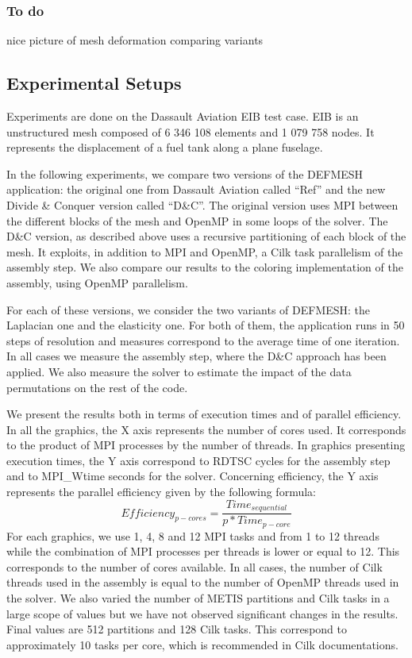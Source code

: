 \documentclass{IOS-Book-Article}
\begin{document}
\subsubsection{To do}
nice picture of mesh deformation comparing variants\\

\subsection{Experimental Setups}
Experiments are done on the Dassault Aviation EIB test case. EIB is an unstructured mesh composed of 6 346 108 elements and 1 079 758 nodes.
It represents the displacement of a fuel tank along a plane fuselage.

In the following experiments, we compare two versions of the DEFMESH application: the original one from Dassault Aviation called “Ref” and the new Divide \& Conquer
version called “D\&C”.
The original version uses MPI between the different blocks of the mesh and OpenMP in some loops of the solver.
The D\&C version, as described above uses a recursive partitioning of each block of the mesh. It exploits, in addition to MPI and OpenMP,
a Cilk task parallelism of the assembly step.
We also compare our results to the coloring implementation of the assembly, using OpenMP parallelism.

For each of these versions, we consider the two variants of DEFMESH: the Laplacian one and the elasticity one.
For both of them, the application runs in 50 steps of resolution and measures correspond to the average time of one iteration.
In all cases we measure the assembly step, where the D\&C approach has been applied.
We also measure the solver to estimate the impact of the data permutations on the rest of the code.

We present the results both in terms of execution times and of parallel efficiency.
In all the graphics, the X axis represents the number of cores used. It corresponds to the product of MPI processes by the number of threads.
In graphics presenting execution times, the Y axis correspond to RDTSC cycles for the assembly step and to MPI\_Wtime seconds for the solver.
Concerning efficiency, the Y axis represents the parallel efficiency given by the following formula:
$$Efficiency_{p-cores} = \frac{Time_{sequential}}{p*Time_{p-core}}$$
For each graphics, we use 1, 4, 8 and 12 MPI tasks and from 1 to 12 threads while the combination of MPI processes per threads is lower or equal to 12.
This corresponds to the number of cores available. In all cases, the number of Cilk threads used in the assembly is equal to the number of OpenMP threads used in the solver.
We also varied the number of METIS partitions and Cilk tasks in a large scope of values but we have not observed significant changes in the results.
Final values are 512 partitions and 128 Cilk tasks. This correspond to approximately 10 tasks per core, which is recommended in Cilk documentations.
\end{document}

